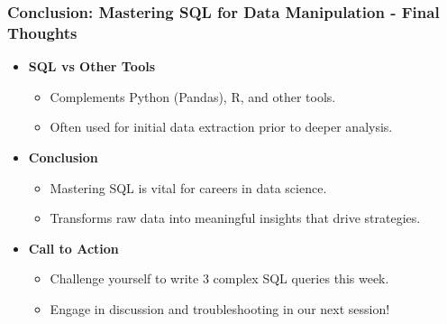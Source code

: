 \documentclass[aspectratio=169]{beamer}
\begin{document}
\begin{frame}[fragile]
    \frametitle{Conclusion: Mastering SQL for Data Manipulation - Final Thoughts}
    \begin{itemize}
        \item \textbf{SQL vs Other Tools}
            \begin{itemize}
                \item Complements Python (Pandas), R, and other tools.
                \item Often used for initial data extraction prior to deeper analysis.
            \end{itemize}
        
        \item \textbf{Conclusion}
            \begin{itemize}
                \item Mastering SQL is vital for careers in data science.
                \item Transforms raw data into meaningful insights that drive strategies.
            \end{itemize}
        
        \item \textbf{Call to Action}
            \begin{itemize}
                \item Challenge yourself to write 3 complex SQL queries this week.
                \item Engage in discussion and troubleshooting in our next session!
            \end{itemize}
    \end{itemize}
\end{frame}
\end{document}
